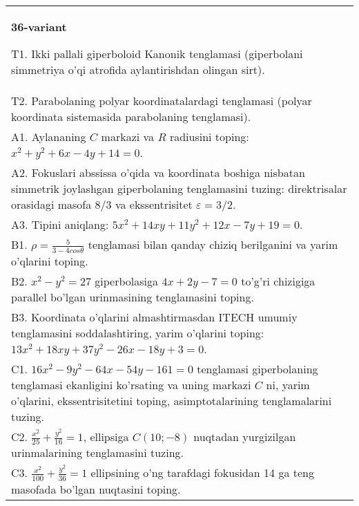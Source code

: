 \documentclass{article}
\begin{document}
\begin{tabular}{m{17cm}}
\textbf{36-variant}
\newline

T1. Ikki pallali giperboloid Kanonik tenglamasi (giperbolani simmetriya o'qi atrofida aylantirishdan olingan sirt).\\

T2. Parabolaning polyar koordinatalardagi tenglamasi (polyar koordinata sistemasida parabolaning tenglamasi).\\

A1. Aylananing $C$ markazi va $R$ radiusini toping: $x^2+y^2+6x-4y+14=0$.\\

A2. Fokuslari abssissa o'qida va koordinata boshiga nisbatan simmetrik joylashgan giperbolaning tenglamasini tuzing: direktrisalar orasidagi masofa $8/3$ va ekssentrisitet $\varepsilon=3/2$.\\

A3. Tipini aniqlang: $5x^{2}+14xy+11y^{2}+12x-7y+19=0$.\\

B1. $\rho = \frac{5}{3 - 4cos\theta}$ tenglamasi bilan qanday chiziq berilganini va yarim o'qlarini toping.  \\

B2. $x^{2} - y^{2} = 27$ giperbolasiga $4x + 2y - 7 = 0$ to'g'ri chizigiga parallel bo'lgan urinmasining tenglamasini toping.  \\

B3. Koordinata o'qlarini almashtirmasdan ITECH umumiy tenglamasini soddalashtiring, yarim o'qlarini toping: $13x^{2} + 18xy + 37y^{2} - 26x - 18y + 3 = 0$.  \\

C1. $16x^{2} - 9y^{2} - 64x - 54y - 161 = 0$ tenglamasi giperbolaning tenglamasi ekanligini ko'rsating va uning markazi $C$ ni, yarim o'qlarini, ekssentrisitetini toping, asimptotalarining tenglamalarini tuzing.  \\

C2. $\frac{x^{2}}{25} + \frac{y^{2}}{16} = 1$, ellipsiga $C(10; - 8)$ nuqtadan yurgizilgan urinmalarining tenglamasini tuzing.  \\

C3. $\frac{x^{2}}{100} + \frac{y^{2}}{36} = 1$ ellipsining o'ng tarafdagi fokusidan 14 ga teng masofada bo'lgan nuqtasini toping.  \\

\end{tabular}
\vspace{1cm}
\end{document}
